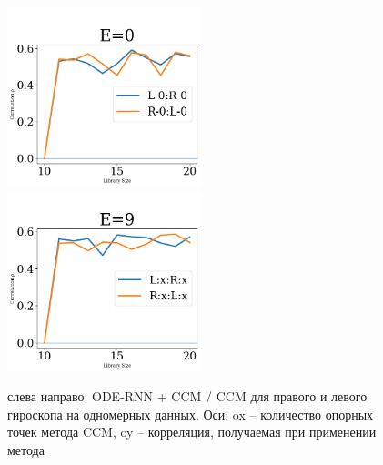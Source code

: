 \documentclass[12pt, twoside]{article}
\begin{document}
\begin{figure}[h!]
	\includegraphics[trim={0.6cm 0.8cm 0 2.7cm},clip=true,width = 0.5\textwidth,height=0.3\textheight]{images/CCM_experiments/net_exp.jpg} \hfill
	\includegraphics[trim={0.6cm 0.8cm 0 2.7cm},clip=true,width = 0.5\textwidth,height=0.3\textheight]{images/CCM_experiments/CCM_exp.jpg} 
	\caption{слева направо: ODE-RNN + CCM / CCM для правого и левого гироскопа на одномерных данных. Оси: ox -- количество опорных точек метода CCM, oy -- корреляция, получаемая при применении метода}
	\label{CCM_apply}
\end{figure}
\end{document}
